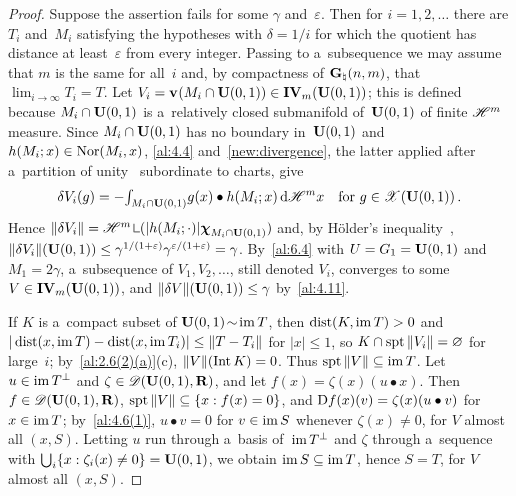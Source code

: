 \begin{proof}
    Suppose the assertion fails for some $\gamma$ and~$\varepsilon$. Then for $i = 1, 2, \ldots$
    there are $T_i$ and~$M_i$ satisfying the hypotheses with $\delta = 1/i$ for which the quotient
    has distance at least~$\varepsilon$ from every integer. Passing to a~subsequence we may assume
    that $m$ is the same for all~$i$ and, by compactness of $\mathbf{G}_{\natural}(n,m)$, that $\lim_{i \to
    \infty} T_i = T$. Let $V_i = \mathbf{v}_{}(M_i \cap \mathbf{U}(0,1)) \in \mathbf{IV}_{m}(\mathbf{U}(0,1))$; this
    is defined because $M_i \cap \mathbf{U}(0,1)$ is a~relatively closed submanifold
    of~$\mathbf{U}(0,1)$ of finite $\mathscr{H}^m$ measure. Since $M_i \cap \mathbf{U}(0,1)$ has no boundary
    in~$\mathbf{U}(0,1)$ and $h(M_i;x) \in \operatorname{Nor}(M_i,x)$, \ref{al:4.4} and~\ref{new:divergence},
    the latter applied after a~partition of unity~\cite[3.1.13]{Federer1969} subordinate to
    charts, give
    \begin{displaymath}
        \delta V_i(g) = - {\textstyle\int_{M_i \cap \mathbf{U}(0,1)}^{}} g(x) \bullet h(M_i;x) \,\mathrm{d} \mathscr{H}^m x
        \quad \text{for $g \in \mathscr{X}(\mathbf{U}(0,1))$} \,.
    \end{displaymath}
    Hence $\|\delta V_i\| = \HM^m \restrict (|h(M_i;\cdot)| \CF{M_i \cap \oball{0}{1}})$
    and, by H\"older's inequality~\cite[2.4.14]{Federer1969}, $\|\delta V_i\|(\mathbf{U}(0,1)) \le
    \gamma^{1/(1+\varepsilon)} \gamma^{\varepsilon/(1+\varepsilon)} = \gamma$. By~\ref{al:6.4}
    with $U = G_1 = \mathbf{U}(0,1)$ and $M_1 = 2\gamma$, a~subsequence of $V_1, V_2, \ldots$, still
    denoted $V_i$, converges to some $V \in \mathbf{IV}_{m}(\mathbf{U}(0,1))$, and $\|\delta
    V\|(\mathbf{U}(0,1)) \le \gamma$ by~\ref{al:4.11}.

    If $K$ is a~compact subset of $\mathbf{U}(0,1) \!\sim\! \operatorname{im} T$, then $\operatorname{dist}(K, \operatorname{im} T) > 0$ and
    $|\operatorname{dist}(x, \operatorname{im} T) - \operatorname{dist}(x, \operatorname{im} T_i)| \le \|T - T_i\|$ for $|x| \le 1$, so $K \cap \operatorname{spt}
    \|V_i\| = \varnothing$ for large~$i$; by~\ref{al:2.6(2)(a)}(c), $\|V\|(\operatorname{Int} K) = 0$. Thus $\operatorname{spt}
    \|V\| \subseteq \operatorname{im} T$. Let $u \in \operatorname{im} T^\perp$ and $\zeta \in \mathscr{D}(\mathbf{U}(0,1),\mathbf{R})$, and
    let $f(x) = \zeta(x) (u \bullet x)$. Then $f \in \mathscr{D}(\mathbf{U}(0,1),\mathbf{R})$, $\operatorname{spt} \|V\|
    \subseteq \{ x : f(x) = 0 \}$, and $\mathrm{D} f(x)(v) = \zeta(x) (u \bullet v)$ for $x \in \operatorname{im} T$;
    by~\ref{al:4.6(1)}, $u \bullet v = 0$ for $v \in \operatorname{im} S$ whenever $\zeta(x) \ne 0$, for $V$
    almost all $(x,S)$. Letting $u$ run through a~basis of~$\operatorname{im} T^\perp$ and $\zeta$ through
    a~sequence with ${{\textstyle \bigcup}}_i \{ x : \zeta_i(x) \ne 0 \} = \mathbf{U}(0,1)$, we obtain $\operatorname{im} S
    \subseteq \operatorname{im} T$, hence $S = T$, for $V$ almost all $(x,S)$.


\end{proof}
